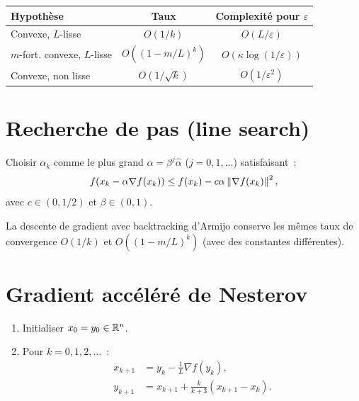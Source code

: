 \begin{formules}[title=\textbf{R\'esum\'e des taux de convergence}]
\begin{center}
\renewcommand{\arraystretch}{1.3}
\begin{tabular}{lcc}
\toprule
\textbf{Hypoth\`ese} & \textbf{Taux} & \textbf{Complexit\'e pour $\varepsilon$} \\
\midrule
Convexe, $L$-lisse & $O(1/k)$ & $O(L/\varepsilon)$ \\
$m$-fort. convexe, $L$-lisse & $O((1-m/L)^k)$ & $O(\kappa\log(1/\varepsilon))$ \\
Convexe, non lisse & $O(1/\sqrt{k})$ & $O(1/\varepsilon^2)$ \\
\bottomrule
\end{tabular}
\end{center}
\end{formules}

\section{Recherche de pas (line search)}

\begin{definition}
Choisir $\alpha_k$ comme le plus grand $\alpha = \beta^j \hat{\alpha}$ ($j = 0,1,\ldots$)
satisfaisant~:
\[
    f(x_k - \alpha\nabla f(x_k)) \leq f(x_k) - c\alpha\left\| \nabla f(x_k) \right\|^2,
\]
avec $c \in (0, 1/2)$ et $\beta \in (0,1)$.
\end{definition}

\begin{proposition}
La descente de gradient avec backtracking d'Armijo conserve les m\^emes taux de
convergence $O(1/k)$ et $O((1-m/L)^k)$ (avec des constantes diff\'erentes).
\end{proposition}

\section{Gradient acc\'el\'er\'e de Nesterov}

\begin{algorithme}[title=\textbf{Gradient acc\'el\'er\'e de Nesterov (NAG)}]
\begin{enumerate}
    \item Initialiser $x_0 = y_0 \in \mathbb{R}^n$.
    \item Pour $k = 0, 1, 2, \ldots$~:
    \begin{align*}
        x_{k+1} &= y_k - \frac{1}{L}\nabla f(y_k), \\
        y_{k+1} &= x_{k+1} + \frac{k}{k+3}(x_{k+1} - x_k).
    \end{align*}
\end{enumerate}
\end{algorithme}

